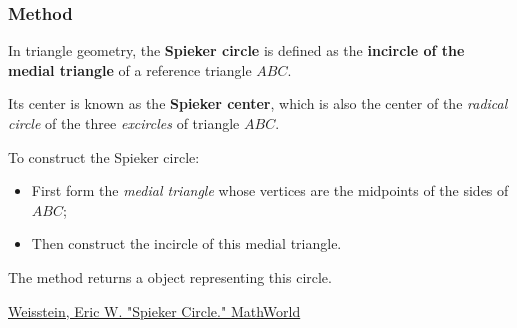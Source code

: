 \subsubsection{Method } %
\label{ssub:method_triangle_spieker__circle}

In triangle geometry, the \textbf{Spieker circle} is defined as the \textbf{incircle of the medial triangle} of a reference triangle $ABC$.

\medskip

Its center is known as the \textbf{Spieker center}, which is also the center of the \emph{radical circle} of the three \emph{excircles} of triangle $ABC$.

\medskip

To construct the Spieker circle:
\begin{itemize}
  \item First form the \emph{medial triangle} whose vertices are the midpoints of the sides of $ABC$;
  \item Then construct the incircle of this medial triangle.
\end{itemize}


The method  returns a  object representing this circle.
\begin{flushright}
\small
\href{https://mathworld.wolfram.com/SpiekerCircle.html}{Weisstein, Eric W. "Spieker Circle." MathWorld}
\end{flushright}

\vspace{1em}



